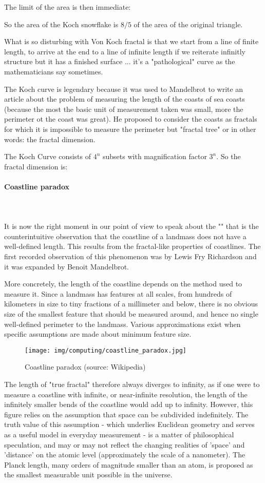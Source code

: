 	The limit of the area is then immediate:
	
	So the area of the Koch snowflake is $8/5$ of the area of the original triangle. 
	
	What is so disturbing with Von Koch fractal is that we start from a line of finite length, to arrive at the end to a line of infinite length if we reiterate infinitly structure but it has a finished surface ... it's a "pathological" curve as the mathematicians say sometimes.
	
	The Koch curve is legendary because it was used to Mandelbrot to write an article about the problem of measuring the length of the coasts of sea coasts (because the most the basic unit of measurement taken was small, more the perimeter ot the coast was great). He proposed to consider the coasts as fractals for which it is impossible to measure the perimeter but "fractal tree" or in other words: the fractal dimension.
	
	The Koch Curve consists of $4^n$ subsets with magnification factor $3^n$. So the fractal dimension is:
	
	
	\paragraph{Coastline paradox}\mbox{}\\\\
	It is now the right moment in our point of view to speak about the "" that is the counterintuitive observation that the coastline of a landmass does not have a well-defined length. This results from the fractal-like properties of coastlines. The first recorded observation of this phenomenon was by Lewis Fry Richardson and it was expanded by Benoit Mandelbrot.

	More concretely, the length of the coastline depends on the method used to measure it. Since a landmass has features at all scales, from hundreds of kilometers in size to tiny fractions of a millimeter and below, there is no obvious size of the smallest feature that should be measured around, and hence no single well-defined perimeter to the landmass. Various approximations exist when specific assumptions are made about minimum feature size.
	\begin{figure}[H]
		\centering
		\texttt{[image: img/computing/coastline\_paradox.jpg]}
		\caption{Coastline paradox (source: Wikipedia)}
	\end{figure}
	The length of "true fractal" therefore always diverges to infinity, as if one were to measure a coastline with infinite, or near-infinite resolution, the length of the infinitely smaller bends of the coastline would add up to infinity. However, this figure relies on the assumption that space can be subdivided indefinitely. The truth value of this assumption - which underlies Euclidean geometry and serves as a useful model in everyday measurement - is a matter of philosophical speculation, and may or may not reflect the changing realities of 'space' and 'distance' on the atomic level (approximately the scale of a nanometer). The Planck length, many orders of magnitude smaller than an atom, is proposed as the smallest measurable unit possible in the universe.

